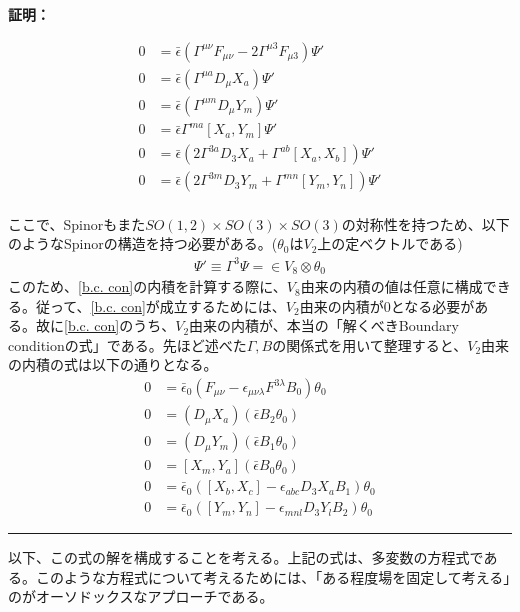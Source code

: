 \documentclass[dvipdfmx,a4paper,10.5pt]{article}
\numberwithin{equation}{section}
\newenvironment{proofbox}
{\begin{prooflabel}\textbf{証明：}\end{prooflabel}\vspace{0.8em}}
{\par\vspace{1em}\hrule\vspace{1em}}
\begin{document}
\begin{proofbox}
\begin{equation}
    \begin{split}
    0&=\bar{\epsilon}(\Gamma^{\mu\nu}F_{\mu\nu}-2\Gamma^{\mu3}F_{\mu3})\Psi'\\
    0&=\bar{\epsilon}(\Gamma^{\mu a}D_{\mu}X_{a})\Psi'\\
    0&=\bar{\epsilon}(\Gamma^{\mu m}D_{\mu}Y_{m})\Psi'\\
    0&=\bar{\epsilon}\Gamma^{m a}[X_{a},Y_{m}]\Psi'\\
    0&=\bar{\epsilon}(2\Gamma^{3a}D_{3}X_{a}+\Gamma^{ab}[X_{a},X_{b}])\Psi'\\
    0&=\bar{\epsilon}(2\Gamma^{3m}D_{3}Y_{m}+\Gamma^{mn}[Y_{m},Y_{n}])\Psi'
    \end{split}
\end{equation}\\
ここで、Spinorもまた$SO(1,2)\times SO(3)\times SO(3)$の対称性を持つため、以下のようなSpinorの構造を持つ必要がある。($\theta_{0}$は$V_{2}$上の定ベクトルである)
\begin{equation}\begin{split}
    \Psi'\equiv\Gamma^{3}\Psi=\in V_{8}\otimes \theta_{0}
\end{split} \end{equation}
このため、\eqref{b.c. con}の内積を計算する際に、$V_{8}$由来の内積の値は任意に構成できる。従って、\eqref{b.c. con}が成立するためには、$V_{2}$由来の内積が0となる必要がある。故に\eqref{b.c. con}のうち、$V_{2}$由来の内積が、本当の「解くべきBoundary conditionの式」である。先ほど述べた$\Gamma,B$の関係式を用いて整理すると、$V_{2}$由来の内積の式は以下の通りとなる。
\begin{equation}\label{true_b.c.}
\begin{split}
     0&=\bar{\epsilon}_{0}(F_{\mu\nu}-\epsilon_{\mu\nu\lambda}F^{3\lambda}B_{0})\theta_{0}\\
    0&=(D_{\mu}X_{a})(\bar{\epsilon}B_{2}\theta_{0})\\
    0&=(D_{\mu}Y_{m})(\bar{\epsilon}B_{1}\theta_{0})\\
    0&=[X_{m},Y_{a}](\bar{\epsilon}B_{0}\theta_{0})\\
    0&=\bar{\epsilon}_{0}([X_{b},X_{c}]-\epsilon_{abc}D_{3}X_{a}B_{1})\theta_{0}\\
    0&=\bar{\epsilon}_{0}([Y_{m},Y_{n}]-\epsilon_{mnl}D_{3}Y_{l}B_{2})\theta_{0}
\end{split}
\end{equation}
\end{proofbox}
以下、この式の解を構成することを考える。上記の式は、多変数の方程式である。このような方程式について考えるためには、「ある程度場を固定して考える」のがオーソドックスなアプローチである。\\
\end{document}
